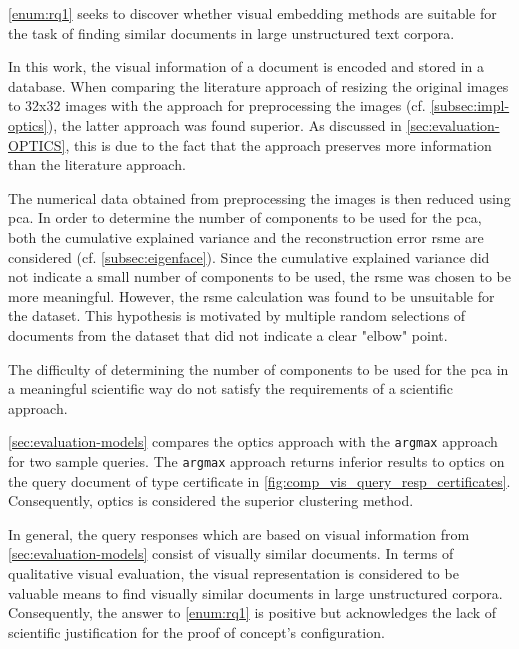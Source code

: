 \ref{enum:rq1} seeks to discover whether visual embedding methods are suitable 
for the task of finding similar documents in large unstructured text corpora.

In this work, the visual information of a document is encoded and stored in a database.
When comparing the literature approach of resizing the original images to 32x32 images with the 
\eigendocs{} approach for preprocessing the images (cf. \autoref{subsec:impl-optics}), 
the latter approach was found superior.
As discussed in \autoref{sec:evaluation-OPTICS}, 
this is due to the fact that the \eigendocs{} approach preserves more information than the literature approach.

The numerical data obtained from preprocessing the images is then reduced using \ac{pca}.
In order to determine the number of components to be used for the \ac{pca}, 
both the cumulative explained variance and the reconstruction error \ac{rsme} are considered 
(cf. \autoref{subsec:eigenface}).
Since the cumulative explained variance did not indicate a small number of components to be used, 
the \ac{rsme} was chosen to be more meaningful.
However, the \ac{rsme} calculation was found to be unsuitable for the dataset.
This hypothesis is motivated by multiple random selections of documents from the dataset that
did not indicate a clear "elbow" point.

The difficulty of determining the number of components to be used for the \ac{pca} in a meaningful scientific way 
do not satisfy the requirements of a scientific approach.

\autoref{sec:evaluation-models} compares the \ac{optics} approach 
with the \texttt{argmax} approach for two sample queries.
The \texttt{argmax} approach returns inferior results to \ac{optics} on the query document 
of type certificate in \autoref{fig:comp_vis_query_resp_certificates}.
Consequently, \ac{optics} is considered the superior clustering method.

In general, the query responses which are based on visual information from \autoref{sec:evaluation-models} 
consist of visually similar documents.
In terms of qualitative visual evaluation, the visual representation is considered to be 
valuable means to find visually similar documents in large unstructured corpora.
Consequently, the answer to \ref{enum:rq1} is positive but 
acknowledges the lack of scientific justification for the proof of concept's configuration.